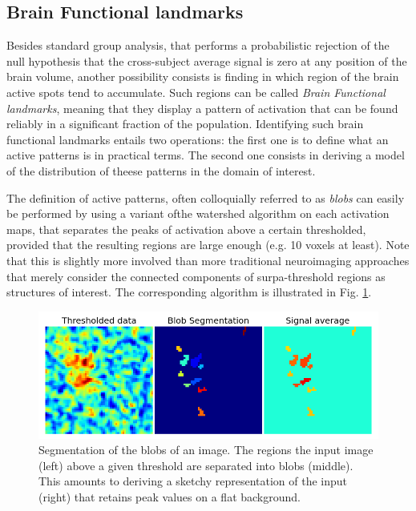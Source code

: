 \documentclass{bioinfo}
\begin{document}
\subsection{Brain Functional landmarks}

Besides standard group analysis, that performs a probabilistic
rejection of the null hypothesis that the cross-subject average signal
is zero at any position of the brain volume, another possibility
consists is finding in which region of the brain active spots tend to
accumulate.
%
Such regions can be called \textit{Brain Functional landmarks},
meaning that they display a pattern of activation that can be found
reliably in a significant fraction of the population.
% 
Identifying such brain functional landmarks entails two operations:
the first one is to define what an active patterns is in practical
terms. The second one consists in deriving a model of the distribution
of theese patterns in the domain of interest.

The definition of active patterns, often colloquially referred to as
\textit{blobs} can easily be performed by using a variant ofthe
watershed algorithm on each activation maps, that separates the peaks
of activation above a certain thresholded, provided that the resulting
regions are large enough (e.g. 10 voxels at least).
%
Note that this is slightly more involved than more traditional
neuroimaging approaches that merely consider the connected components
of surpa-threshold regions as structures of interest.
%
The corresponding algorithm is illustrated in Fig. \ref{fig:watershed}.

\begin{figure}
\includegraphics[width=\linewidth]{Figures/blob}
\caption{Segmentation of the blobs of an image. The regions the input
  image (left) above a given threshold are separated into blobs
  (middle). This amounts to deriving a sketchy representation of the
  input (right) that retains peak values on a flat background.}
\label{fig:watershed}
\end{figure}
\end{document}
